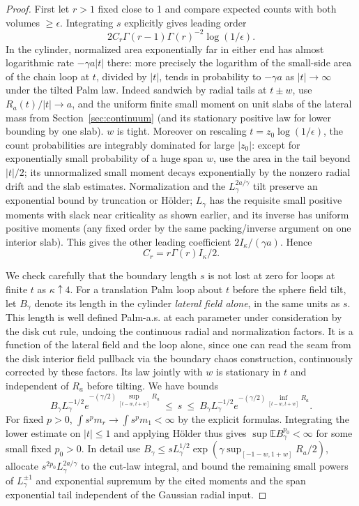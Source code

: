 \begin{proof}

First let \(r>1\) fixed close to 1 and compare expected counts with both volumes \(\ge\epsilon\). Integrating \(s\) explicitly gives leading order
\[
 2 C_r\Gamma(r-1)\Gamma(r)^{-2}\log(1/\epsilon).
\]
In the cylinder, normalized area exponentially far in either end has almost logarithmic rate \(-\gamma a|t|\) there: more precisely the logarithm of the small-side area of the chain loop at \(t\), divided by \(|t|\), tends in probability to \(-\gamma a\) as \(|t|\to\infty\) under the tilted Palm law.
Indeed sandwich by radial tails at \(t\pm w\), use \(R_a(t)/|t|\to a\), and the uniform finite small moment on unit slabs of the lateral mass from Section~\ref{sec:continuum} (and its stationary positive law for lower bounding by one slab). \(w\) is tight.
Moreover on rescaling \(t=z_0\log(1/\epsilon)\), the count probabilities are integrably dominated for large \(|z_0|\): except for exponentially small probability of a huge span \(w\), use the area in the tail beyond \(|t|/2\); its unnormalized small moment decays exponentially by the nonzero radial drift and the slab estimates.
Normalization and the \(L_\gamma^{2a/\gamma}\) tilt preserve an exponential bound by truncation or Hölder; \(L_\gamma\) has the requisite small positive moments with slack near criticality as shown earlier, and its inverse has uniform positive moments (any fixed order by the same packing/inverse argument on one interior slab).
This gives the other leading coefficient \(2 I_\kappa/(\gamma a)\).
Hence
\[
 C_r=r\Gamma(r)I_\kappa/2.
\]


We check carefully that the boundary length \(s\) is not lost at zero for loops at finite \(t\) as \(\kappa\uparrow4\).
For a translation Palm loop about \(t\) before the sphere field tilt, let \(B_\gamma\) denote its length in the cylinder \emph{lateral field alone}, in the same units as \(s\).
This length is well defined Palm-a.s. at each parameter under consideration by the disk cut rule, undoing the continuous radial and normalization factors.
It is a function of the lateral field and the loop alone, since one can read the seam from the disk interior field pullback via the boundary chaos construction, continuously corrected by these factors.
Its law jointly with \(w\) is stationary in \(t\) and independent of \(R_a\) before tilting.
We have bounds
\[
 B_\gamma L_\gamma^{-1/2} e^{-(\gamma/2)\sup_{[t-w,t+w]}R_a}\ \le\ s\ \le\
 B_\gamma L_\gamma^{-1/2} e^{-(\gamma/2)\inf_{[t-w,t+w]}R_a}.
\]
For fixed \(p>0\), \(\int s^p m_r\to\int s^p m_1<\infty\) by the explicit formulas.
Integrating the lower estimate on \(|t|\le1\) and applying Hölder thus gives \(\sup\mathbb E B_\gamma^{p_0}<\infty\) for some small fixed \(p_0>0\).
In detail use \(B_\gamma\le s L_\gamma^{1/2}\exp(\gamma\sup_{[-1-w,1+w]}R_a/2)\), allocate \(s^{2p_0}L_\gamma^{2a/\gamma}\) to the cut-law integral, and bound the remaining small powers of \(L_\gamma^{\pm1}\) and exponential supremum by the cited moments and the span exponential tail independent of the Gaussian radial input.


\end{proof}
